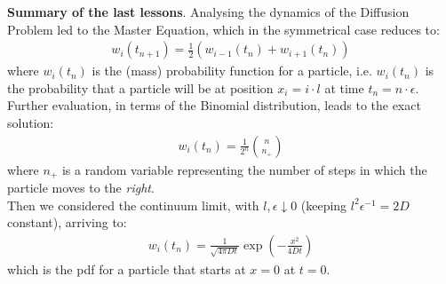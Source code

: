 \documentclass[../template.tex]{subfiles}
\begin{document}

\textbf{Summary of the last lessons}.
Analysing the dynamics of the Diffusion Problem led to the Master Equation, which in the symmetrical case reduces to:
\begin{align}
    w_i(t_{n+1}) = \frac{1}{2}(w_{i-1}(t_n) + w_{i+1}(t_n)) 
    \label{eqn:master_equation}
\end{align}
where $w_i(t_n)$ is the (mass) probability function for a particle, i.e. $w_i(t_n)$ is the probability that a particle will be at position $x_i = i\cdot l$ at time $t_n = n \cdot \epsilon$.\\
Further evaluation, in terms of the Binomial distribution, leads to the exact solution:
\begin{align}
    w_i(t_n) = \frac{1}{2^n} {n\choose n_+} 
    \label{eqn:discrete_sol}
\end{align}
where $n_+$ is a random variable representing the number of steps in which the particle moves to the \textit{right}.\\
Then we considered the continuum limit, with $l, \epsilon \downarrow 0$ (keeping $l^2 \epsilon^{-1} = 2D$ constant), arriving to:
\begin{align}
    w_i(t_n) = \frac{1}{\sqrt{4 \pi D t}} \exp\left(-\frac{x^2}{4 D t} \right)
    \label{eqn:solution-from-discrete} 
\end{align} 
which is the pdf for a particle that starts at $x=0$ at $t=0$.
\end{document}

